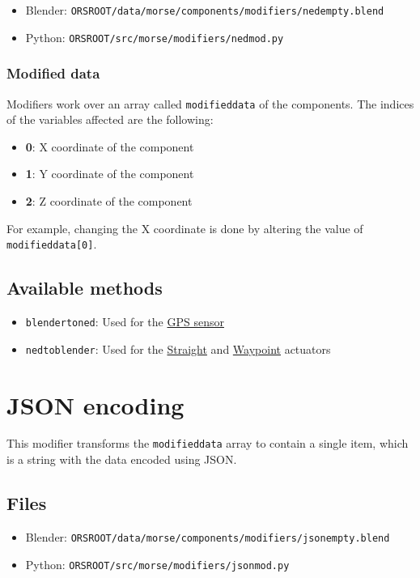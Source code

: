 \documentclass[twoside,a4paper,10pt]{report}
\newcommand{\dokutitlelevelone}[1]{\chapter{#1}}
\newcommand{\dokutitleleveltwo}[1]{\section{#1}}
\newcommand{\dokutitleleveltree}[1]{\subsection{#1}}
\newcommand{\dokubold}[1]{\textbf{#1}}
\newcommand{\dokumonospace}[1]{\texttt{#1}}
\newcommand{\dokuitem}{\item}
\begin{document}
\begin{itemize}
\dokuitem  Blender: \dokumonospace{{\textdollar}ORS{\textunderscore}ROOT/data/morse/components/modifiers/ned{\textunderscore}empty.blend}
\dokuitem  Python: \dokumonospace{{\textdollar}ORS{\textunderscore}ROOT/src/morse/modifiers/ned{\textunderscore}mod.py}
\end{itemize}

\dokutitleleveltree{Modified data}
\label{c1a1a093b7ca2545d0d88cac0ff8ccf6}%
Modifiers work over an array called \dokumonospace{modified{\textunderscore}data} of the components.
The indices of the variables affected are the following:


\begin{itemize}
\dokuitem  \dokubold{0}: X coordinate of the component
\dokuitem  \dokubold{1}: Y coordinate of the component
\dokuitem  \dokubold{2}: Z coordinate of the component
\end{itemize}

For example, changing the X coordinate is done by altering the value of \dokumonospace{modified{\textunderscore}data[0]}.


\dokutitleleveltwo{Available methods}
\label{a2d06dcb42bbd0519b19166fd7f36cea}%

\begin{itemize}
\dokuitem  \dokumonospace{blender{\textunderscore}to{\textunderscore}ned}: Used for the \hyperref[11648e4e66e7ed6a86cb7f1d0cf604fe]{ GPS sensor}
\dokuitem  \dokumonospace{ned{\textunderscore}to{\textunderscore}blender}: Used for the \hyperref[6990a54322d9232390a784c5c9247dd6]{ Straight} and \hyperref[f75862c2bd0040eb683048c313dcaaa8]{ Waypoint} actuators
\end{itemize}

\dokutitlelevelone{JSON encoding}
\label{2e3b13382733d486a7c0529f6a875385}%
\label{466deec76ecdf5fca6d38571f6324d54}%
This modifier transforms the \dokumonospace{modified{\textunderscore}data} array to contain a single item, which is a string with the data encoded using JSON.


\dokutitleleveltwo{Files}
\label{45b963397aa40d4a0063e0d85e4fe7a1}%

\begin{itemize}
\dokuitem  Blender: \dokumonospace{{\textdollar}ORS{\textunderscore}ROOT/data/morse/components/modifiers/json{\textunderscore}empty.blend}
\dokuitem  Python: \dokumonospace{{\textdollar}ORS{\textunderscore}ROOT/src/morse/modifiers/json{\textunderscore}mod.py}
\end{itemize}
\end{document}
